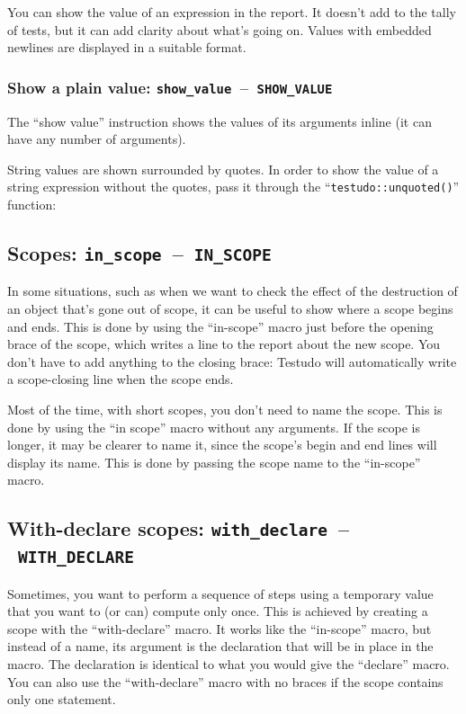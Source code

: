 \documentclass[twoside, a4paper, article]{memoir}
\newcommand*\testudocolor{\color{red!80!blue}}
\newcommand*\testudo[1]{\texttt{\testudocolor{}#1}}
\newcommand*\testudopair[2]{\testudo{#1}~--~\testudo{#2}}
\newcommand\subsectiontestudopair[3]{%
  \subsection[#1]{#1: \testudopair{#2}{#3}}}
\newcommand\subsubsectiontestudopair[3]{%
  \subsubsection[#1]{#1: \testudopair{#2}{#3}}}
\newcommand\typesetexampleandreport[1]{%
  \typesetexamplesource{#1}
  \typesetexamplereport{#1}
}
\providecommand\typesetexamplereport[1]{%
}
\providecommand\typesetexamplesource[1]{%
}
\begin{document}
You can show the value of an expression in the report.  It doesn't add to the
tally of tests, but it can add clarity about what's going on.  Values with
embedded newlines are displayed in a suitable format.

\subsubsectiontestudopair{Show a plain value}%
  {show\_value}{SHOW\_VALUE}
\label{sec:show-plain-value}

The ``show value'' instruction shows the values of its arguments inline (it can
have any number of arguments).

\typesetexampleandreport{show-value}

String values are shown surrounded by quotes.  In order to show the value of a
string expression without the quotes, pass it through the
``\texttt{testudo::unquoted()}'' function:

\typesetexampleandreport{show-value-unquoted}

\subsectiontestudopair{Scopes}{in\_scope}{IN\_SCOPE}
\label{sec:scopes}

In some situations, such as when we want to check the effect of the destruction
of an object that's gone out of scope, it can be useful to show where a scope
begins and ends.  This is done by using the ``in-scope'' macro just before the
opening brace of the scope, which writes a line to the report about the new
scope.  You don't have to add anything to the closing brace: Testudo will
automatically write a scope-closing line when the scope ends.

Most of the time, with short scopes, you don't need to name the scope.  This is
done by using the ``in scope'' macro without any arguments.  If the scope is
longer, it may be clearer to name it, since the scope's begin and end lines
will display its name.  This is done by passing the scope name to the
``in-scope'' macro.

\typesetexampleandreport{in-scope}

\subsectiontestudopair{With-declare scopes}{with\_declare}{WITH\_DECLARE}
\label{sec:with-declare-scopes}

Sometimes, you want to perform a sequence of steps using a temporary value that
you want to (or can) compute only once.  This is achieved by creating a scope
with the ``with-declare'' macro.  It works like the ``in-scope'' macro, but
instead of a name, its argument is the declaration that will be in place in the
macro.  The declaration is identical to what you would give the ``declare''
macro.  You can also use the ``with-declare'' macro with no braces if the scope
contains only one statement.
\end{document}
